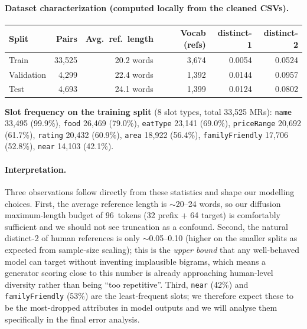 \documentclass[11pt,a4paper]{article}
\begin{document}
\paragraph{Dataset characterization (computed locally from the cleaned CSVs).}

\begin{center}
\renewcommand{\arraystretch}{1.15}
\begin{tabular}{l r r r r r}
\toprule
\textbf{Split} & \textbf{Pairs} & \textbf{Avg.\ ref.\ length} & \textbf{Vocab (refs)} & \textbf{distinct-1} & \textbf{distinct-2} \\
\midrule
Train      & 33{,}525 & 20.2 words & 3{,}674 & 0.0054 & 0.0524 \\
Validation &  4{,}299 & 22.4 words & 1{,}392 & 0.0144 & 0.0957 \\
Test       &  4{,}693 & 24.1 words & 1{,}399 & 0.0124 & 0.0802 \\
\bottomrule
\end{tabular}
\end{center}

\noindent\textbf{Slot frequency on the training split} (8 slot types, total
33{,}525 MRs): \texttt{name} 33{,}495 (99.9\%), \texttt{food} 26{,}469
(79.0\%), \texttt{eatType} 23{,}141 (69.0\%), \texttt{priceRange} 20{,}692
(61.7\%), \texttt{rating} 20{,}432 (60.9\%), \texttt{area} 18{,}922
(56.4\%), \texttt{familyFriendly} 17{,}706 (52.8\%), \texttt{near} 14{,}103
(42.1\%).

\paragraph{Interpretation.}
Three observations follow directly from these statistics and shape our
modelling choices.
First, the average reference length is $\sim$20--24 words, so our diffusion
maximum-length budget of 96~tokens (32 prefix + 64 target) is comfortably
sufficient and we should not see truncation as a confound.
Second, the natural distinct-2 of human references is only $\sim$0.05--0.10
(higher on the smaller splits as expected from sample-size scaling); this is
the \emph{upper bound} that any well-behaved model can target without
inventing implausible bigrams, which means a generator scoring close to this
number is already approaching human-level diversity rather than being
``too repetitive''.
Third, \texttt{near} (42\%) and \texttt{familyFriendly} (53\%) are the
least-frequent slots; we therefore expect these to be the most-dropped
attributes in model outputs and we will analyse them specifically in the
final error analysis.
\end{document}
